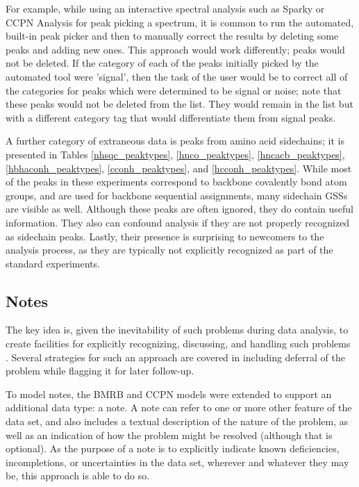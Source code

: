 For example, while using an interactive spectral analysis such as Sparky or
CCPN Analysis \cite{sparky, ccpn} for peak picking a spectrum, it is common
to run the automated, built-in peak picker and then to manually correct the
results by deleting some peaks and adding new ones.  This approach would
work differently; peaks would not be deleted.  If the category of each of the
peaks initially picked by the automated tool were 'signal', then the task of
the user would be to correct all of the categories for peaks which were 
determined to be signal or noise; note that these peaks would not be deleted
from the list.  They would remain in the list but with a different category
tag that would differentiate them from signal peaks.

A further category of extraneous data is peaks from amino acid sidechains; 
it is presented in Tables \ref{nhsqc_peaktypes}, \ref{hnco_peaktypes}, 
\ref{hncacb_peaktypes}, \ref{hbhaconh_peaktypes}, \ref{cconh_peaktypes}, and
\ref{hcconh_peaktypes}.  While most of the
peaks in these experiments correspond to backbone covalently bond atom groups, 
and are used for backbone sequential assignments, many sidechain GSSs are
visible as well.  Although these peaks are often ignored, they do contain
useful information.  They also can confound analysis if they are not properly
recognized as sidechain peaks.  Lastly, their presence is surprising to 
newcomers to the analysis process, as they are typically not explicitly 
recognized as part of the standard experiments.



\subsection{Notes}
The key idea is, given the inevitability of such problems during data
analysis, to create facilities for explicitly recognizing, discussing, 
and handling such problems \cite{robillard2007concerns}. 
Several strategies for such an approach 
are covered in \cite{nuseibeh2000inconsistency} including deferral of the
problem while flagging it for later follow-up.

To model notes, the BMRB and CCPN models \cite{bmrb, ccpn} were extended
to support an additional data type: a note.  A note can refer to one or more
other feature of the data set, and also includes a textual description of
the nature of the problem, as well as an indication of how the problem might
be resolved (although that is optional).  As the purpose of a note is to
explicitly indicate known deficiencies, incompletions, or uncertainties in 
the data set, wherever and whatever they may be, this approach is able to do
so.

